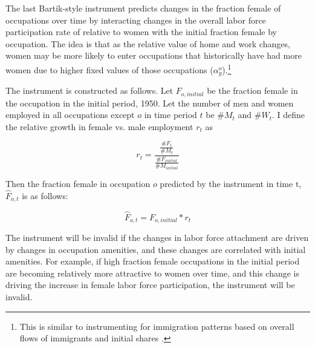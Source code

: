 \documentclass[12pt]{article}
\begin{document}


The last Bartik-style instrument predicts changes in the fraction female of occupations over time by interacting changes in the overall labor force participation rate of relative to women with the initial fraction female by occupation. The idea is that as the relative value of home and work changes, women may be more likely to enter occupations that historically have had more women due to higher fixed values of those occupations ($\alpha^o_g$).\footnote{This is similar to instrumenting for immigration patterns based on overall flows of immigrants and initial shares \cite{Altonji1991a}.} 

The instrument is constructed as follows. Let $F_{o,initial}$ be the fraction female in the occupation in the initial period, 1950. Let the number of men and women employed in all occupations except $o$ in time period $t$ be $\#M_t$ and $\#W_t$. I define the relative growth in female vs. male employment $r_t$ as

$$ r_t = \frac{ \frac{\#F_t}{\#M_t} }{ \frac{\#F_{initial}}{\#M_{initial}} }$$

Then the fraction female in occupation $o$ predicted by the instrument in time t, $\hat{F}_{o,t}$ is as follows:

$$\hat{F}_{o,t} = F_{o,initial} * r_t $$

The instrument will be invalid if the changes in labor force attachment are driven by changes in occupation amenities, and these changes are correlated with initial amenities. For example, if high fraction female occupations in the initial period are becoming relatively more attractive to women over time, and this change is driving the increase in female labor force participation, the instrument will be invalid.
 
\end{document}
